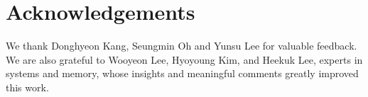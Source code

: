 \section*{Acknowledgements}\label{sec:ack}
We thank Donghyeon Kang, Seungmin Oh and Yunsu Lee for valuable feedback. We are also grateful to Wooyeon Lee, Hyoyoung Kim, and Heekuk Lee, experts in systems and memory, whose insights and meaningful comments greatly improved this work.
